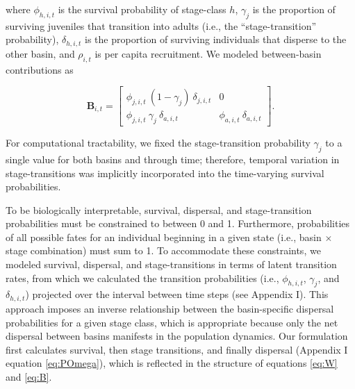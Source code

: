 \documentclass[11pt]{article}
\begin{document}
%
where $\phi_{h,i,t}$ is the survival probability of stage-class $h$, 
$\gamma_{j}$ is the proportion of surviving juveniles that transition into adults
(i.e., the ``stage-transition'' probability),
$\delta_{h,i,t}$ is the proportion of surviving individuals that disperse to the other basin,
and $\rho_{i,t}$ is per capita recruitment.
We modeled between-basin contributions as
%
\begin{linenomath*}
\begin{equation} \label{eq:B}
\mathbf{B}_{i,t} = 
\left[
\begin{array}{cccc}
    \phi_{j,i,t}~(1 - \gamma_{j})~\delta_{j,i,t} & 
    0 \\
    
    \phi_{j,i,t}~\gamma_{j}~\delta_{a,i,t} & 
    \phi_{a,i,t}~\delta_{a,i,t}
    \end{array}
\right].
\end{equation}
\end{linenomath*}
%
For computational tractability, 
we fixed the stage-transition probability $\gamma_{j}$ to a single value 
for both basins and through time; 
therefore, temporal variation in stage-transitions was implicitly incorporated 
into the time-varying survival probabilities.

To be biologically interpretable, 
survival, dispersal, and stage-transition probabilities must be constrained to between
0 and 1.
Furthermore, 
probabilities of all possible fates for an individual beginning in a given state 
(i.e., basin $\times$ stage combination) must sum to 1.
To accommodate these constraints,
we modeled survival, dispersal, and stage-transitions 
in terms of latent transition rates,
from which we calculated the transition probabilities 
(i.e., $\phi_{h,i,t}$, $\gamma_{j}$, and $\delta_{h,i,t}$) 
projected over the interval between time steps (see Appendix I).
This approach imposes an inverse relationship between
the basin-specific dispersal probabilities for a given stage class,
which is appropriate because only the net dispersal between basins manifests 
in the population dynamics. 
Our formulation first calculates survival, then stage transitions, and finally dispersal
(Appendix I equation \ref{eq:POmega}),
which is reflected in the structure of equations \ref{eq:W} and \ref{eq:B}. 
\end{document}

